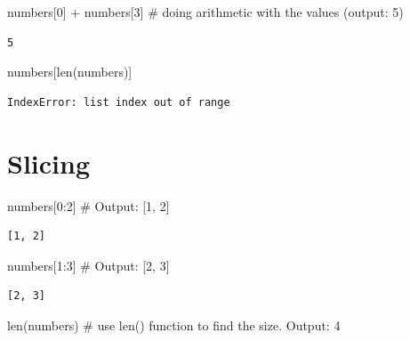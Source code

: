 \documentclass[
  letterpaper,
  DIV=11,
  numbers=noendperiod]{scrreprt}
\newenvironment{Shaded}{\begin{snugshade}}{\end{snugshade}}
\newcommand{\BuiltInTok}[1]{\textcolor[rgb]{0.00,0.23,0.31}{#1}}
\newcommand{\CommentTok}[1]{\textcolor[rgb]{0.37,0.37,0.37}{#1}}
\newcommand{\DecValTok}[1]{\textcolor[rgb]{0.68,0.00,0.00}{#1}}
\newcommand{\NormalTok}[1]{\textcolor[rgb]{0.00,0.23,0.31}{#1}}
\newcommand{\OperatorTok}[1]{\textcolor[rgb]{0.37,0.37,0.37}{#1}}
\begin{document}
\begin{Shaded}
\begin{Highlighting}[]
\NormalTok{numbers[}\DecValTok{0}\NormalTok{] }\OperatorTok{+}\NormalTok{ numbers[}\DecValTok{3}\NormalTok{] }\CommentTok{\# doing arithmetic with the values (output: 5)}
\end{Highlighting}
\end{Shaded}

\begin{verbatim}
5
\end{verbatim}

\begin{Shaded}
\begin{Highlighting}[]
\NormalTok{numbers[}\BuiltInTok{len}\NormalTok{(numbers)]}
\end{Highlighting}
\end{Shaded}

\begin{verbatim}
IndexError: list index out of range
\end{verbatim}

\hypertarget{slicing-1}{%
\section{Slicing}\label{slicing-1}}

\begin{Shaded}
\begin{Highlighting}[]
\NormalTok{numbers[}\DecValTok{0}\NormalTok{:}\DecValTok{2}\NormalTok{] }\CommentTok{\# Output: [1, 2]}
\end{Highlighting}
\end{Shaded}

\begin{verbatim}
[1, 2]
\end{verbatim}

\begin{Shaded}
\begin{Highlighting}[]
\NormalTok{numbers[}\DecValTok{1}\NormalTok{:}\DecValTok{3}\NormalTok{] }\CommentTok{\# Output: [2, 3]}
\end{Highlighting}
\end{Shaded}

\begin{verbatim}
[2, 3]
\end{verbatim}

\begin{Shaded}
\begin{Highlighting}[]
\BuiltInTok{len}\NormalTok{(numbers) }\CommentTok{\# use len() function to find the size. Output: 4}
\end{Highlighting}
\end{Shaded}
\end{document}
